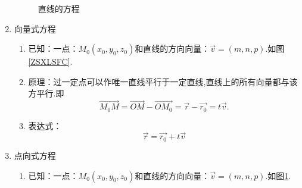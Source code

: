 \begin{enumerate}[\large1.]
\begin{figure}[h]
{\begin{minipage}[b]{0.5\linewidth}
				\label{ZSCSFC}
			\end{minipage}
		}
		\caption{直线的方程\uppercase\expandafter{}}
	\end{figure}
	\item {\color{dy}\large 向量式方程}
	\begin{enumerate}[]
		\item 已知：{\color{dl}一点}：$M_0(x_0,y_0,z_0)$和{\color{dl}直线的方向向量}：$\overrightarrow{v}=(m,n,p)$.如图\ref{ZSXLSFC}.
		\item 原理：过一定点可以作唯一直线平行于一定直线,直线上的所有向量都与该方平行.即
		$$\overrightarrow{M_0M}=\overrightarrow{OM}-\overrightarrow{OM_0}=\overrightarrow{r}-\overrightarrow{r_0}=t\overrightarrow{v}.$$
		\item 表达式：
		\begin{equation}
		\overrightarrow{r}=\overrightarrow{r_0}+t\overrightarrow{v}
		\end{equation}
	\end{enumerate}
	\item {\color{dy}\large 点向式方程}\label{点向式方程}
	\begin{enumerate}[]
		\item 已知：{\color{dl}一点}：$M_0(x_0,y_0,z_0)$和{\color{dl}直线的方向向量}：$\overrightarrow{v}=(m,n,p)$.如图\ref{ZSCSFC}.

\end{enumerate}
\end{enumerate}
